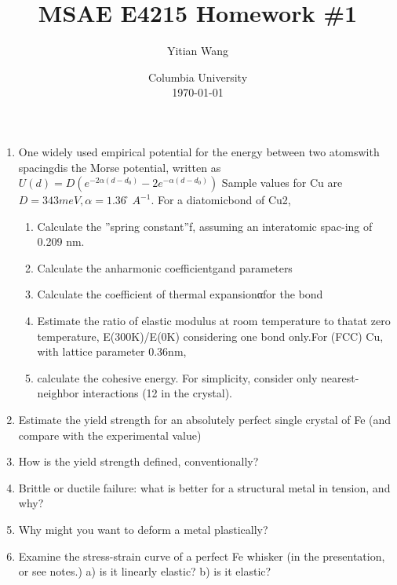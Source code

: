 \documentclass{article}
\title{MSAE E4215 Homework \#1}
\author{Yitian Wang}
\date{Columbia University \\ \today}
\begin{document}
\maketitle
\begin{enumerate}
\item One widely used empirical potential for the energy between two atomswith spacingdis the Morse potential, 
written as
$U(d) =D(e^{-2α(d - d_0)} - 2e^{ - α(d - d_0)})$
Sample values for Cu are$D= 343 meV,α= 1.36 ̊A^{−1}$.  
For a diatomicbond of Cu2,

\begin{enumerate}[label=(\alph*)]
\item Calculate the ”spring constant”f, assuming an interatomic spac-ing of 0.209 nm.
\item Calculate the anharmonic coefficientgand parameters
\item Calculate the coefficient of thermal expansionαfor the bond
\item Estimate the ratio of elastic modulus at room temperature to thatat zero temperature,
E(300K)/E(0K) considering one bond only.For (FCC) Cu, 
with lattice parameter 0.36nm,
\item calculate the cohesive energy. For simplicity, consider only nearest-neighbor interactions (12 in the crystal).

\end{enumerate}


\item Estimate the yield strength for an absolutely perfect single crystal of Fe 
(and compare with the experimental value)

\item How is the yield strength defined, conventionally? 

\item Brittle or ductile failure: what is better for a structural metal in tension, 
and why?

\item Why might you want to deform a metal plastically? 

\item Examine the stress-strain curve of a perfect Fe whisker (in the presentation, or see notes.)  
a) is it linearly elastic?  b) is it elastic? 


\end{enumerate}
\end{document}
